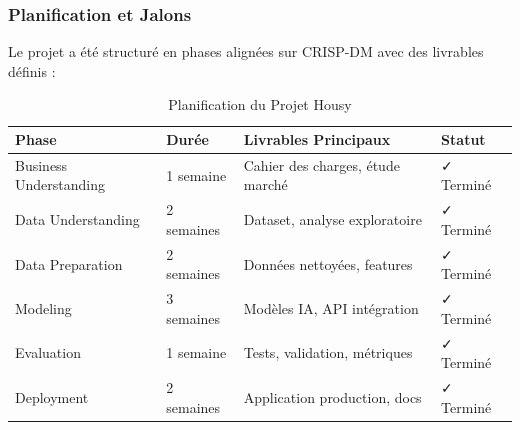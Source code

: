 \subsubsection{Planification et Jalons}

Le projet a été structuré en phases alignées sur CRISP-DM avec des livrables définis :

\begin{table}[H]
\centering
\caption{Planification du Projet Housy}
\begin{tabular}{|l|l|l|l|}
\hline
\textbf{Phase} & \textbf{Durée} & \textbf{Livrables Principaux} & \textbf{Statut} \\
\hline
Business Understanding & 1 semaine & Cahier des charges, étude marché & ✓ Terminé \\
\hline
Data Understanding & 2 semaines & Dataset, analyse exploratoire & ✓ Terminé \\
\hline
Data Preparation & 2 semaines & Données nettoyées, features & ✓ Terminé \\
\hline
Modeling & 3 semaines & Modèles IA, API intégration & ✓ Terminé \\
\hline
Evaluation & 1 semaine & Tests, validation, métriques & ✓ Terminé \\
\hline
Deployment & 2 semaines & Application production, docs & ✓ Terminé \\
\hline
\end{tabular}
\label{tab:planification_projet}
\end{table}
